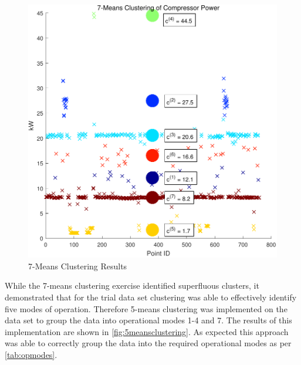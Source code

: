 \begin{figure}
\includegraphics[width = \columnwidth]{./Images/7MeansClustering.pdf}
\caption{7-Means Clustering Results}
\label{fig:7meansclustering}
\end{figure}

While the 7-means clustering exercise identified superfluous clusters, it demonstrated that for the trial data set clustering was able to effectively identify five modes of operation. Therefore 5-means clustering was implemented on the data set to group the data into operational modes 1-4 and 7. The results of this implementation are shown in \autoref{fig:5meansclustering}. As expected this approach was able to correctly group the data into the required operational modes as per \autoref{tab:opmodes}.

